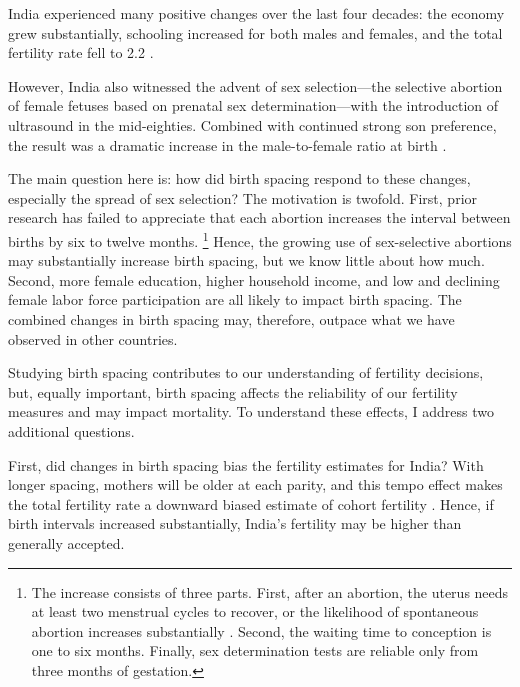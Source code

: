 \documentclass[12pt,letterpaper]{article}
\begin{document}


India experienced many positive changes over the last four decades:
the economy grew substantially,
schooling increased for both males and females,
and the total fertility rate fell to 2.2 
\citep{Bosworth2008,Dharmalingam2014,
International-Institute-for-Population-Sciences-IIPS2017}.

However, India also witnessed the advent of sex selection---the selective abortion of 
female fetuses based on prenatal sex determination---with the introduction of ultrasound 
in the mid-eighties.
Combined with continued strong son preference, the result was a dramatic increase in the 
male-to-female ratio at birth
\citep{das_gupta97,Arnold2002,retherford03b,Guilmoto2012,Portner2015b,Jayachandran2017}.


The main question here is: how did birth spacing respond to these changes, especially 
the spread of sex selection? 
The motivation is twofold.
First, prior research has failed to appreciate that each abortion increases the
interval between births by six to twelve months.%
\footnote{
The increase consists of three parts. 
First, after an abortion, the uterus needs at least two menstrual cycles to recover, 
or the likelihood of spontaneous abortion increases substantially \citep{zhou00b}. 
Second, the waiting time to conception is one to six months. 
Finally, sex determination tests are reliable only from three months of gestation. 
}
Hence, the growing use of sex-selective abortions may substantially increase birth spacing, 
but we know little about how much. 
Second, more female education, higher household income, and low and declining female labor 
force participation are all likely to impact birth spacing. 
The combined changes in birth spacing may, therefore, outpace what we have observed in 
other countries.

Studying birth spacing contributes to our understanding of fertility decisions, but, equally 
important, birth spacing affects the reliability of our fertility measures and may 
impact mortality. 
To understand these effects, I address two additional questions. 

First, did changes in birth spacing bias the fertility estimates for India? 
With longer spacing, mothers will be older at each parity, and this tempo effect makes the 
total fertility rate a downward biased estimate of cohort fertility
\citep{Hotz1997,Bongaarts1999,Ni-Bhrolchain2011}. 
Hence, if birth intervals increased substantially, India's fertility may be higher 
than generally accepted.
\end{document}
